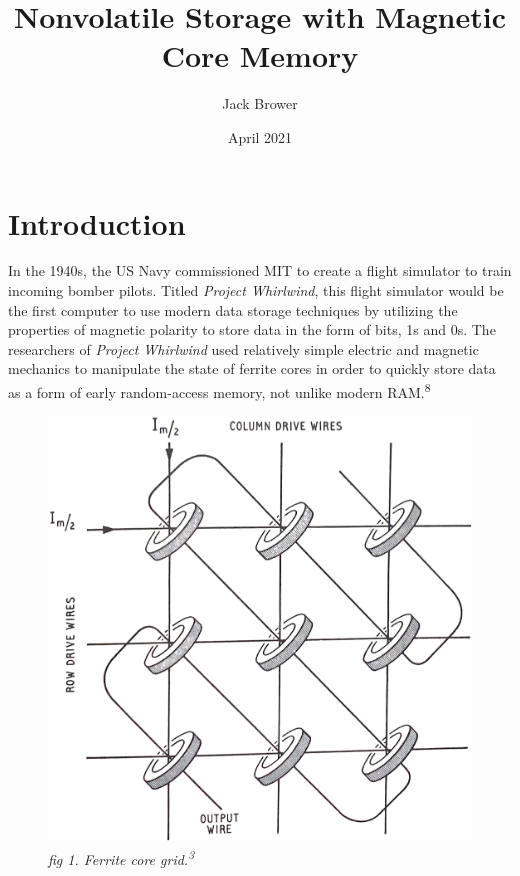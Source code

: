 \documentclass{article}
\title{Nonvolatile Storage with Magnetic Core Memory}
\author{Jack Brower}
\date{April 2021}
\begin{document}
\maketitle

\section{Introduction}
In the 1940s, the US Navy commissioned MIT to create a flight simulator to train incoming bomber pilots. Titled \emph{Project Whirlwind}, this flight simulator would be the first computer to use modern data storage techniques by utilizing the properties of magnetic polarity to store data in the form of bits, 1s and 0s. The researchers of \emph{Project Whirlwind} used relatively simple electric and magnetic mechanics to manipulate the state of ferrite cores in order to quickly store data as a form of early random-access memory, not unlike modern RAM.\textsuperscript{8}

\begin{figure}
  \includegraphics[width=\linewidth]{img/bookcoregrid.png}
  \caption{\small \emph{fig 1. Ferrite core grid.\textsuperscript{3}}}
\end{figure}
\end{document}
